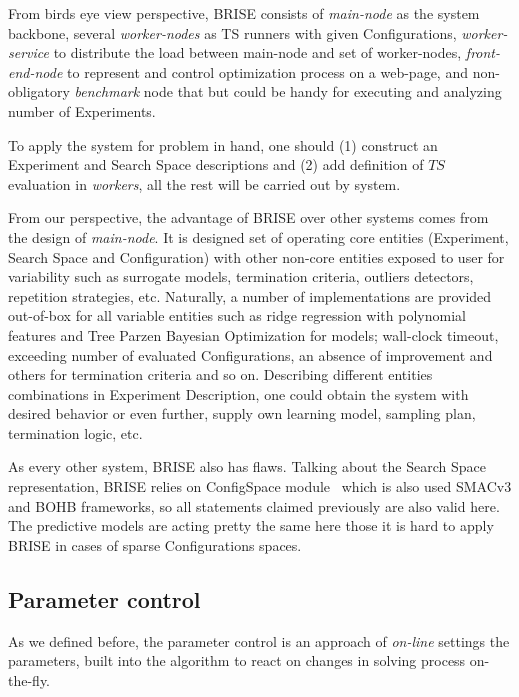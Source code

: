 From birds eye view perspective, BRISE consists of \textit{main-node} as the system backbone, several \textit{worker-nodes} as TS runners with given Configurations, \textit{worker-service} to distribute the load between main-node and set of worker-nodes, \textit{front-end-node} to represent and control optimization process on a web-page, and non-obligatory \textit{benchmark} node that but could be handy for executing and analyzing number of Experiments. 

To apply the system for problem in hand, one should (1) construct an Experiment and Search Space descriptions and (2) add definition of $TS$ evaluation in \textit{workers}, all the rest will be carried out by system.

From our perspective, the advantage of BRISE over other systems comes from the design of \textit{main-node}. It is designed set of operating core entities (Experiment, Search Space and Configuration) with other non-core entities exposed to user for variability such as surrogate models, termination criteria, outliers detectors, repetition strategies, etc. Naturally, a number of implementations are provided out-of-box for all variable entities such as ridge regression with polynomial features and Tree Parzen Bayesian Optimization for models; wall-clock timeout, exceeding number of evaluated Configurations, an absence of improvement and others for termination criteria and so on. Describing different entities combinations in Experiment Description, one could obtain the system with desired behavior or even further, supply own learning model, sampling plan, termination logic, etc. 


As every other system, BRISE also has flaws. Talking about the Search Space representation, BRISE relies on ConfigSpace module~\cite{configspace} which is also used SMACv3 and BOHB frameworks, so all statements claimed previously are also valid here. The predictive models are acting pretty the same here those it is hard to apply BRISE in cases of sparse Configurations spaces.


\subsection{Parameter control}\label{bg: parameter control}
As we defined before, the parameter control is an approach of \textit{on-line} settings the parameters, built into the algorithm to react on changes in solving process on-the-fly.

